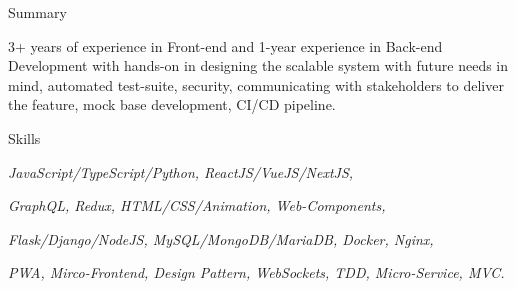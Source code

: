 \documentclass{resume} %
\begin{document}

\begin{rSection}{Summary}
  \begin{rSummarySection}
  {
    \item 3+ years of experience in Front-end and 1-year experience in Back-end Development with hands-on in designing the scalable system with future needs in mind, automated test-suite, security, communicating with stakeholders to deliver the feature, mock base development, CI/CD pipeline.
  }
  \end{rSummarySection}
\end{rSection}


\begin{rSection}{Skills}
  \begin{rSummarySection}
  {
    \item {\it JavaScript/TypeScript/Python, ReactJS/VueJS/NextJS,} 
    \item {\it GraphQL, Redux, HTML/CSS/Animation, Web-Components,}
    \item {\it Flask/Django/NodeJS, MySQL/MongoDB/MariaDB, Docker, Nginx,}
    \item {\it PWA, Mirco-Frontend, Design Pattern, WebSockets, TDD, Micro-Service, MVC.}
  }
  \end{rSummarySection}
\end{rSection}

\end{document}
